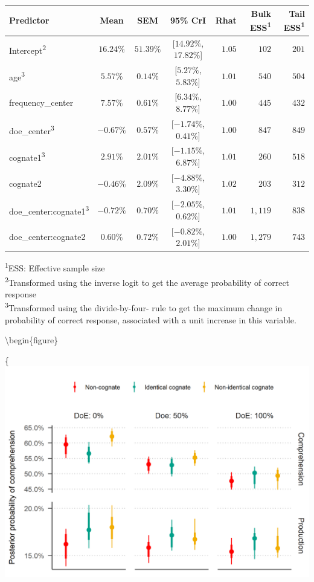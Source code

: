 \documentclass[
  english,
  man,man,floatsintext]{apa6}
\begin{document}
\captionsetup[table]{labelformat=empty,skip=1pt}
\begin{longtable}{lcccrrr}
\toprule
\textbf{Predictor} & \textbf{Mean} & \textbf{SEM} & \textbf{95\% CrI} & \textbf{Rhat} & \textbf{Bulk ESS}\textsuperscript{1} & \textbf{Tail ESS}\textsuperscript{1} \\ 
\midrule
Intercept\textsuperscript{2} & $16.24\%$ & $51.39\%$ & [$14.92\%$, $17.82\%$] & $1.05$ & $102$ & $201$ \\ 
age\textsuperscript{3} & $5.57\%$ & $0.14\%$ & [$5.27\%$, $5.83\%$] & $1.01$ & $540$ & $504$ \\ 
frequency\_center & $7.57\%$ & $0.61\%$ & [$6.34\%$, $8.77\%$] & $1.00$ & $445$ & $432$ \\ 
doe\_center\textsuperscript{3} & $-0.67\%$ & $0.57\%$ & [$-1.74\%$, $0.41\%$] & $1.00$ & $847$ & $849$ \\ 
cognate1\textsuperscript{3} & $2.91\%$ & $2.01\%$ & [$-1.15\%$, $6.87\%$] & $1.01$ & $260$ & $518$ \\ 
cognate2 & $-0.46\%$ & $2.09\%$ & [$-4.88\%$, $3.30\%$] & $1.02$ & $203$ & $312$ \\ 
doe\_center:cognate1\textsuperscript{3} & $-0.72\%$ & $0.70\%$ & [$-2.05\%$, $0.62\%$] & $1.01$ & $1,119$ & $838$ \\ 
doe\_center:cognate2 & $0.60\%$ & $0.72\%$ & [$-0.82\%$, $2.01\%$] & $1.00$ & $1,279$ & $743$ \\ 
\bottomrule
\end{longtable}
\vspace{-5mm}
\begin{minipage}{\linewidth}
\textsuperscript{1}ESS: Effective sample size \\ 
\textsuperscript{2}Transformed using the inverse logit to get the average probability of correct response \\ 
\textsuperscript{3}Transformed using the divide-by-four- rule to get the maximum change in probability of correct response, associated with a unit increase in this variable. \\ 
\end{minipage}

\textbackslash begin\{figure\}

\{\centering \includegraphics[width=0.8\linewidth]{manuscript_files/figure-latex/emmeans-1}
\end{document}
